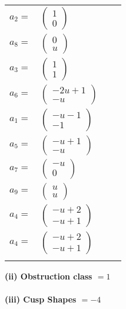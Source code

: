 \documentclass[1p]{elsarticle_modified}
\theoremstyle{definition}
\begin{document}
\begin{tabular}{m{7pt} m{180pt} m{7pt} m{180pt} }
\flushright $a_{2}=$&$\begin{pmatrix}1\\0\end{pmatrix}$ \\
\flushright $a_{8}=$&$\begin{pmatrix}0\\u\end{pmatrix}$ \\
\flushright $a_{3}=$&$\begin{pmatrix}1\\1\end{pmatrix}$ \\
\flushright $a_{6}=$&$\begin{pmatrix}-2 u+1\\- u\end{pmatrix}$ \\
\flushright $a_{1}=$&$\begin{pmatrix}- u-1\\-1\end{pmatrix}$ \\
\flushright $a_{5}=$&$\begin{pmatrix}- u+1\\- u\end{pmatrix}$ \\
\flushright $a_{7}=$&$\begin{pmatrix}- u\\0\end{pmatrix}$ \\
\flushright $a_{9}=$&$\begin{pmatrix}u\\u\end{pmatrix}$ \\
\flushright $a_{4}=$&$\begin{pmatrix}- u+2\\- u+1\end{pmatrix}$\\ \flushright $a_{4}=$&$\begin{pmatrix}- u+2\\- u+1\end{pmatrix}$\\&\end{tabular}
\flushleft \textbf{(ii) Obstruction class $= 1$}\\~\\
\flushleft \textbf{(iii) Cusp Shapes $= -4$}\\~\\
\end{document}
